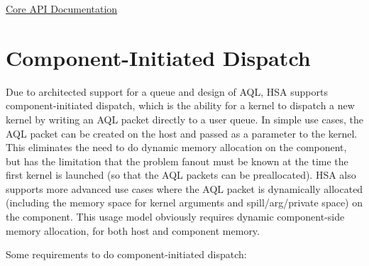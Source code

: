 \hyperlink{coreapi}{Core A\-P\-I
Documentation}\hypertarget{coreapi_dtde}{}\section{Component-\/\-Initiated
Dispatch}\label{coreapi_dtde}

Due to architected support for a queue and design of A\-Q\-L,
H\-S\-A supports component-\/initiated dispatch, which is the ability
for a kernel to dispatch a new kernel by writing an A\-Q\-L packet
directly to a user queue. In simple use cases, the A\-Q\-L packet
can be created on the host and passed as a parameter to the kernel.
This eliminates the need to do dynamic memory allocation on the
component, but has the limitation that the problem fanout must be known
at the time the first kernel is launched (so that the A\-Q\-L
packets can be preallocated). H\-S\-A also supports more advanced
use cases where the A\-Q\-L packet is dynamically allocated
(including the memory space for kernel arguments and
spill/arg/private space) on the component. This usage model obviously
requires dynamic component-\/side memory allocation, for both host and
component memory.

Some requirements to do component-\/initiated dispatch\-:

